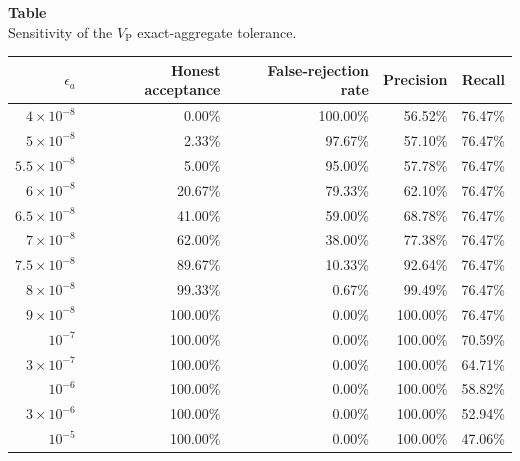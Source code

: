 \noindent\begin{minipage}{\textwidth}
\label{tab:appendix_v2_sensitivity}
\textbf{Table~\thetable}\\
Sensitivity of the $V_{\mathrm{P}}$ exact-aggregate tolerance.
\par\smallskip
\centering
\scriptsize
\setlength{\tabcolsep}{4pt}
\renewcommand{\arraystretch}{1.05}
\begin{tabular}{rrrrr}
\toprule
$\epsilon_a$ & Honest acceptance & False-rejection rate & Precision & Recall \\
\midrule
$4\!\times\!10^{-8}$ & 0.00\% & 100.00\% & 56.52\% & 76.47\% \\
$5\!\times\!10^{-8}$ & 2.33\% & 97.67\% & 57.10\% & 76.47\% \\
$5.5\!\times\!10^{-8}$ & 5.00\% & 95.00\% & 57.78\% & 76.47\% \\
$6\!\times\!10^{-8}$ & 20.67\% & 79.33\% & 62.10\% & 76.47\% \\
$6.5\!\times\!10^{-8}$ & 41.00\% & 59.00\% & 68.78\% & 76.47\% \\
$7\!\times\!10^{-8}$ & 62.00\% & 38.00\% & 77.38\% & 76.47\% \\
$7.5\!\times\!10^{-8}$ & 89.67\% & 10.33\% & 92.64\% & 76.47\% \\
$8\!\times\!10^{-8}$ & 99.33\% & 0.67\% & 99.49\% & 76.47\% \\
$9\!\times\!10^{-8}$ & 100.00\% & 0.00\% & 100.00\% & 76.47\% \\
$10^{-7}$ & 100.00\% & 0.00\% & 100.00\% & 70.59\% \\
$3\!\times\!10^{-7}$ & 100.00\% & 0.00\% & 100.00\% & 64.71\% \\
$10^{-6}$ & 100.00\% & 0.00\% & 100.00\% & 58.82\% \\
$3\!\times\!10^{-6}$ & 100.00\% & 0.00\% & 100.00\% & 52.94\% \\
$10^{-5}$ & 100.00\% & 0.00\% & 100.00\% & 47.06\% \\
\bottomrule
\end{tabular}
\end{minipage}

